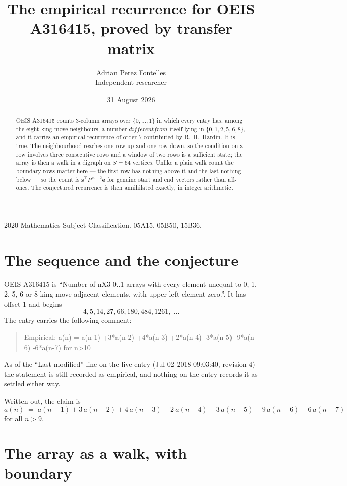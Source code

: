 \documentclass[11pt,a4paper]{article}
\title{The empirical recurrence for OEIS A316415, proved by transfer matrix}
\author{Adrian Perez Fontelles\\ \small Independent researcher}
\date{31 August 2026}
\theoremstyle{plain}
\theoremstyle{definition}
\begin{document}
\maketitle

\begin{abstract}
OEIS A316415 counts $3$-column arrays over $\{0,\dots,1\}$ in which every entry has,
among the eight king-move neighbours, a number $different from$ itself lying in $\{0,1,2,5,6,8\}$, and it carries an empirical
recurrence of order $7$ contributed by R.~H.~Hardin. It is true. The neighbourhood
reaches one row up and one row down, so the condition on a row involves three consecutive
rows and a window of two rows is a sufficient state; the array is then a walk in a digraph
on $S=64$ vertices. Unlike a plain walk count the boundary rows matter here --- the first
row has nothing above it and the last nothing below --- so the count is
$\mathbf{s}^{\!\top}P^{\,n-2}\mathbf{e}$ for genuine start and end vectors rather than
all-ones. The conjectured recurrence is then annihilated exactly, in integer arithmetic.
\end{abstract}

\noindent\small 2020 Mathematics Subject Classification. 05A15, 05B50, 15B36.\normalsize

\section{The sequence and the conjecture}

OEIS A316415 is ``Number of nX3 0..1 arrays with every element unequal to 0, 1, 2, 5, 6 or 8 king-move adjacent elements, with upper left element zero.''. It has offset
$1$ and begins
\[
4, 5, 14, 27, 66, 180, 484, 1261,\ \dots
\]
The entry carries the following comment:
\begin{quote}\small
Empirical: a(n) = a(n-1) +3*a(n-2) +4*a(n-3) +2*a(n-4) -3*a(n-5) -9*a(n-6) -6*a(n-7) for n>10
\end{quote}
As of the ``Last modified'' line on the live entry (Jul 02 2018 09:03:40, revision
4) the statement is still recorded as empirical, and nothing on the entry
records it as settled either way.

Written out, the claim is
\begin{equation}\label{eq:conj}
a(n)\;=\;a(n-1) + 3\,a(n-2) + 4\,a(n-3) + 2\,a(n-4) - 3\,a(n-5) - 9\,a(n-6) - 6\,a(n-7)
\end{equation}
for all $n>9$.

\section{The array as a walk, with boundary}
\end{document}
